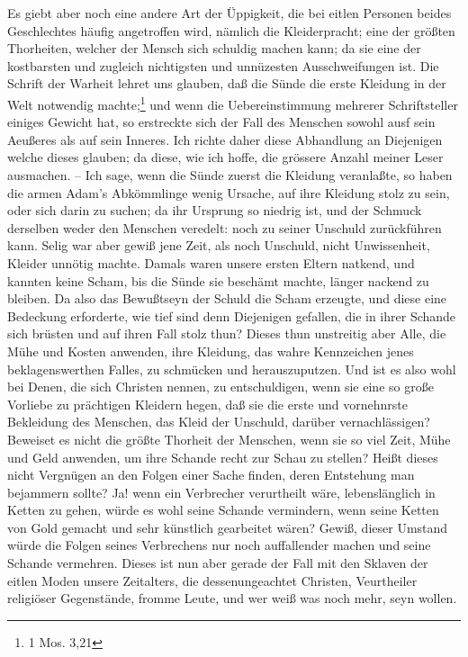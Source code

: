 Es giebt aber noch eine andere Art der Üppigkeit, die bei eitlen Personen beides
Geschlechtes häufig angetroffen wird, nämlich die Kleiderpracht; eine der
größten Thorheiten, welcher der Mensch sich schuldig machen kann; da sie eine
der kostbarsten und zugleich nichtigsten und unnüzesten Ausschweifungen ist. Die
Schrift der Warheit lehret uns glauben, daß die Sünde die erste Kleidung in der
Welt notwendig machte;\footnote{1 Mos. 3,21} und wenn die Uebereinstimmung
mehrerer Schriftsteller einiges Gewicht hat, so erstreckte sich der Fall des
Menschen sowohl ausf sein Aeußeres als auf sein Inneres. Ich richte daher diese
Abhandlung an Diejenigen welche dieses glauben; da diese, wie ich hoffe, die
grössere Anzahl meiner Leser ausmachen. -- Ich sage, wenn die Sünde zuerst die
Kleidung veranlaßte, so haben die armen Adam’s Abkömmlinge wenig Ursache, auf
ihre Kleidung stolz zu sein, oder sich darin zu suchen; da ihr Ursprung so
niedrig ist, und der Schmuck derselben weder den Menschen veredelt: noch zu
seiner Unschuld zurückführen kann. Selig war aber gewiß jene Zeit, als noch
Unschuld, nicht Unwissenheit, Kleider unnötig machte. Damals waren unsere ersten
Eltern natkend, und kannten keine Scham, bis die Sünde sie beschämt machte,
länger nackend zu bleiben. Da also das Bewußtseyn der Schuld die Scham erzeugte,
und diese eine Bedeckung erforderte, wie tief sind denn Diejenigen gefallen, die
in ihrer Schande sich brüsten und auf ihren Fall stolz thun? Dieses thun
unstreitig aber Alle, die Mühe und Kosten anwenden, ihre Kleidung, das wahre
Kennzeichen jenes beklagenswerthen Falles, zu schmücken und herauszuputzen. Und
ist es also wohl bei Denen, die sich Christen nennen, zu entschuldigen, wenn sie
eine so große Vorliebe zu prächtigen Kleidern hegen, daß sie die erste und
vornehnrste Bekleidung des Menschen, das Kleid der Unschuld, darüber
vernachlässigen? Beweiset es nicht die größte Thorheit der Menschen, wenn sie so
viel Zeit, Mühe und Geld anwenden, um ihre Schande recht zur Schau zu stellen?
Heißt dieses nicht Vergnügen an den Folgen einer Sache finden, deren Entstehung
man bejammern sollte? Ja! wenn ein Verbrecher verurtheilt wäre, lebenslänglich
in Ketten zu gehen, würde es wohl seine Schande vermindern, wenn seine Ketten
von Gold gemacht und sehr künstlich gearbeitet wären? Gewiß, dieser Umstand
würde die Folgen seines Verbrechens nur noch auffallender machen und seine
Schande vermehren. Dieses ist nun aber gerade der Fall mit den Sklaven der
eitlen Moden unsere Zeitalters, die dessenungeachtet Christen, Veurtheiler
religiöser Gegenstände, fromme Leute, und wer weiß was noch mehr, seyn wollen.
